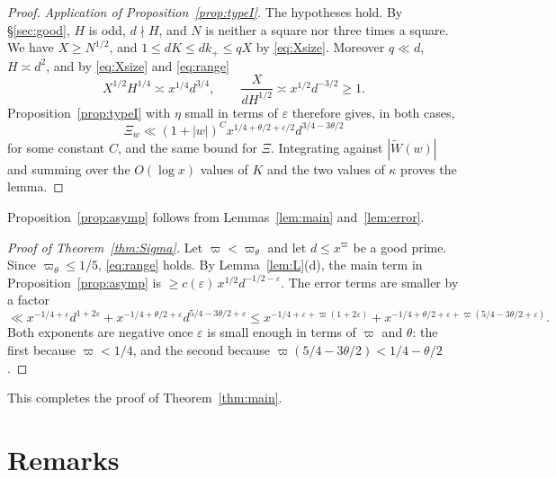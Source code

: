 \documentclass[11pt]{amsart}
\theoremstyle{remark}
\theoremstyle{definition}
\numberwithin{equation}{section}
\newcommand{\eps}{\varepsilon}
\begin{document}
\begin{proof}
\emph{Application of Proposition~\ref{prop:typeI}.} The hypotheses hold. By \S\ref{sec:good}, $H$ is odd, $d\nmid H$, and $N$ is neither a square nor three times a square. We have $X\ge N^{1/2}$, and $1\le dK\le dk_+\le qX$ by \eqref{eq:Xsize}. Moreover $q\ll d$, $H\asymp d^2$, and by \eqref{eq:Xsize} and \eqref{eq:range}
\[
X^{1/2}H^{1/4}\asymp x^{1/4}d^{3/4},\qquad\frac X{dH^{1/2}}\asymp x^{1/2}d^{-3/2}\ge1 .
\]
Proposition~\ref{prop:typeI} with $\eta$ small in terms of $\eps$ therefore gives, in both cases,
\[
\Xi_w\ll(1+|w|)^{C}x^{1/4+\theta/2+\eps/2}d^{3/4-3\theta/2}
\]
for some constant $C$, and the same bound for $\Xi$. Integrating against $|\widetilde W(w)|$ and summing over the $O(\log x)$ values of $K$ and the two values of $\kappa$ proves the lemma.
\end{proof}

Proposition~\ref{prop:asymp} follows from Lemmas~\ref{lem:main} and~\ref{lem:error}.

\begin{proof}[Proof of Theorem~\ref{thm:Sigma}]
Let $\varpi<\varpi_\theta$ and let $d\le x^{\varpi}$ be a good prime. Since $\varpi_\theta\le1/5$, \eqref{eq:range} holds. By Lemma~\ref{lem:L}(d), the main term in Proposition~\ref{prop:asymp} is $\ge c(\eps)\,x^{1/2}d^{-1/2-\eps}$. The error terms are smaller by a factor
\[
\ll x^{-1/4+\eps}d^{1+2\eps}+x^{-1/4+\theta/2+\eps}d^{5/4-3\theta/2+\eps}\le x^{-1/4+\eps+\varpi(1+2\eps)}+x^{-1/4+\theta/2+\eps+\varpi(5/4-3\theta/2+\eps)}.
\]
Both exponents are negative once $\eps$ is small enough in terms of $\varpi$ and $\theta$: the first because $\varpi<1/4$, and the second because $\varpi(5/4-3\theta/2)<1/4-\theta/2$.
\end{proof}

This completes the proof of Theorem~\ref{thm:main}.

\section{Remarks}\label{sec:remarks}
\end{document}
